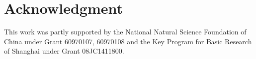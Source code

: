 \documentclass[journal]{IEEEtran}
\begin{document}

\section*{Acknowledgment}
This work was partly supported by the National Natural Science Foundation of China under Grant 60970107, 60970108 and the Key Program for Basic Research of Shanghai under Grant 08JC1411800.

\ifCLASSOPTIONcaptionsoff
  \newpage
\fi


\end{document}
